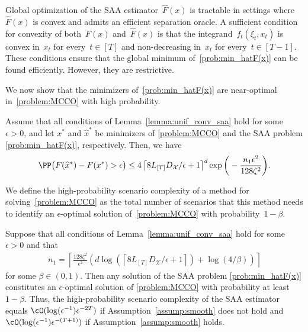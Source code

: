 \documentclass[11pt]{article}
\let\hat\widehat
\begin{document}
\begin{rem}\label{rem:mcce_mcco_transition_saa}
    Global optimization of the SAA estimator~$\hat F(x)$ is tractable in settings where~$\hat{F}(x)$ is convex and admits an efficient separation oracle. A sufficient condition for convexity of both~$F(x)$ and~$\hat F(x)$ is that the integrand~$f_t(\xi_t, x_t)$ is convex in~$x_t$ for every~$t \in [T]$ and non-decreasing in~$x_t$ for every~$t \in [T-1]$. These conditions ensure that the global minimum of~\eqref{prob:min_hatF(x)} can be found efficiently. However, they are restrictive. 
\end{rem}

We now show that the minimizers of~\eqref{prob:min_hatF(x)} are near-optimal in~\eqref{problem:MCCO} with high probability.

\begin{corollary}
\label{cor:high_prob_bound_saa_epsilon_optimal} Assume that all conditions of Lemma~\ref{lemma:unif_conv_saa} hold for some~$\epsilon>0$, and let $x^*$ and $\hat{x}^*$ be minimizers of \eqref{problem:MCCO} and the SAA problem \eqref{prob:min_hatF(x)}, respectively. Then, we have
\begin{align*}
    \PP\big( F(\hat{x}^*) - F(x^*) > \epsilon \big) \leq 4\left\lceil 8L_{[T]} D_\mathcal{X}/\epsilon +1\right\rceil^{d} \exp\bigg(- \frac{n_1\epsilon^2}{128\zeta^2} \bigg).
\end{align*}   
\end{corollary} 


We define the high-probability scenario complexity of a method for solving~\eqref{problem:MCCO} as the total number of scenarios that this method needs to identify an $\epsilon$-optimal solution of~\eqref{problem:MCCO} with probability~$1-\beta$. 

\begin{theorem}
    \label{thm:SAA_sample_complexity_high_probability} Suppose that all conditions of Lemma~\ref{lemma:unif_conv_saa} hold for some~$\epsilon>0$ and that
\begin{align*}
    n_1 =\left\lceil \frac{128\zeta^2}{\epsilon^2} \left(d \log\left( \left\lceil 8L_{[T]}D_\mathcal{X}/\epsilon +1\right\rceil\right) + \log\left(4/\beta \right) \right) \right\rceil
\end{align*}
for some $\beta\in(0,1)$. Then any solution of the SAA problem \eqref{prob:min_hatF(x)} constitutes an $\epsilon$-optimal solution of \eqref{problem:MCCO} with probability at least $1-\beta$. Thus, the high-probability scenario complexity of the SAA estimator equals $\cO(\log(\epsilon^{-1})\epsilon^{-2T})$ if Assumption~\ref{assump:smooth} does not hold and $\cO(\log(\epsilon^{-1})\epsilon^{-(T+1)})$ if Assumption~\ref{assump:smooth} holds.
\end{theorem}
\end{document}
